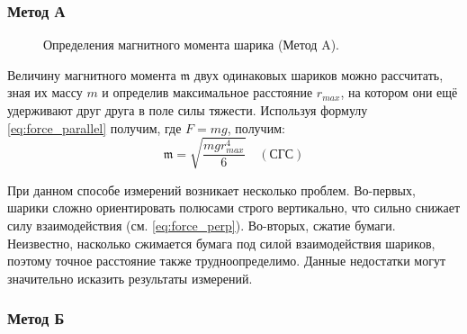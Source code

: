 \documentclass[12pt,a4paper]{article}
\begin{document}
	\subsubsection*{Метод А}
	
	\begin{figure}
		\vspace{-0pt}
		\caption{Определения магнитного момента шарика (Метод A).}
		\label{img:method_a}
	\end{figure}
	Величину магнитного момента $\mathfrak{m}$ двух
	одинаковых шариков можно рассчитать, зная их массу $m$ и определив максимальное расстояние $r_{max}$, на котором они ещё удерживают друг друга в поле силы тяжести. Используя формулу \eqref{eq:force_parallel} получим, где $F=mg$, получим:
	$$ \mathfrak{m} = \sqrt{\frac{mgr_{max}^4}{6}} \quad (\text{СГС}) $$
	
	При данном способе измерений возникает несколько проблем. Во-первых, шарики сложно ориентировать полюсами строго вертикально, что сильно снижает силу взаимодействия (см. \eqref{eq:force_perp}). Во-вторых, сжатие бумаги. Неизвестно, насколько сжимается бумага под силой взаимодействия шариков, поэтому точное расстояние также трудноопределимо. Данные недостатки могут значительно исказить результаты измерений.
	
	\subsubsection*{Метод Б}
\end{document}
